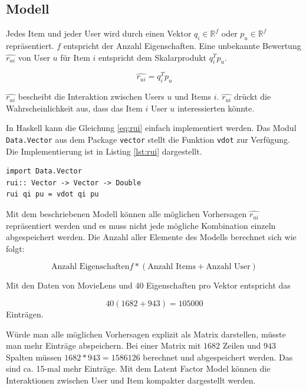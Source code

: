 \documentclass[a4paper, 12pt]{article}
\begin{document}
\subsection{Modell}
\label{sec:matrixfactorizationmodel}

Jedes Item und jeder User wird durch einen Vektor $q_i \in \mathbb{R}^f$ oder $p_u \in \mathbb{R}^f$ repräsentiert. $f$ entspricht der Anzahl Eigenschaften. Eine unbekannte Bewertung $\hat{r_{ui}}$ von User $u$ für Item $i$ entspricht dem Skalarprodukt  $q_i^T p_u$.

\begin{equation}
  \label{eq:rui}
  \hat{r_{ui}} = q_i^T p_u
\end{equation}

$\hat{r_{ui}}$ bescheibt die Interaktion zwischen Users $u$ und Items $i$. $\hat{r_{ui}}$ drückt die Wahrscheinlichkeit aus, dass das Item $i$ User $u$ interessierten könnte.

In Haskell kann die Gleichung \ref{eq:rui} einfach implementiert werden. Das Modul \verb|Data.Vector| aus dem Package \verb|vector| stellt die Funktion \verb|vdot| zur Verfügung. Die Implementierung ist in Listing \ref{lst:rui} dargestellt.

\begin{lstlisting}[caption=Implementierung der Vorhersage, label=lst:rui]
import Data.Vector
rui:: Vector -> Vector -> Double
rui qi pu = vdot qi pu
\end{lstlisting}

Mit dem beschriebenen Modell können alle möglichen Vorhersagen $\hat{r_{ui}}$ repräsentiert werden und es muss nicht jede mögliche Kombination einzeln abgespeichert werden. 
Die Anzahl aller Elemente des Modells berechnet sich wie folgt:

\begin{equation}
  \label{eq:dimred}
  \text{Anzahl Eigenschaften} f * (\text{Anzahl Items}+\text{Anzahl User})
\end{equation}

Mit den Daten von MovieLens und 40 Eigenschaften pro Vektor entspricht das

\begin{equation}
  \label{eq:dimred1}
  40(1682+943) = 105000
\end{equation}
Einträgen.

Würde man alle möglichen Vorhersagen explizit als Matrix darstellen, müsste man mehr Einträge abspeichern. Bei einer Matrix mit $1682$ Zeilen und $943$ Spalten müssen $1682 * 943 = 1586126$ berechnet und abgespeichert werden. Das sind ca. 15-mal mehr Einträge. Mit dem Latent Factor Model können die Interaktionen zwischen User und Item kompakter dargestellt werden.
\end{document}
